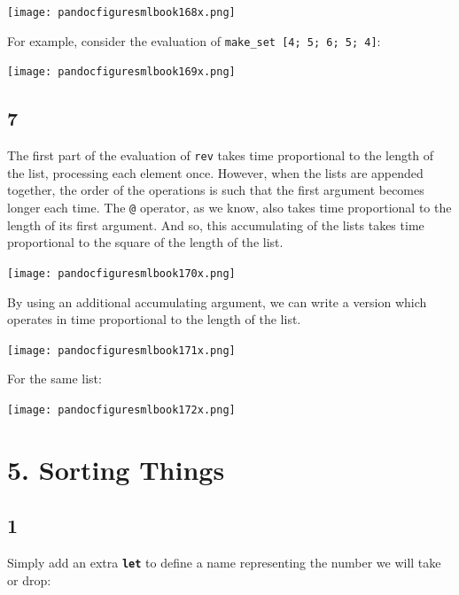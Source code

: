 \documentclass[]{book}
\begin{document}
\medskip
\begin{center}
\noindent\texttt{[image: pandocfiguresmlbook168x.png]}
\end{center}
\medskip

\noindent For example, consider the evaluation of \texttt{make\_set [4; 5; 6; 5; 4]}:

\medskip
\begin{center}
\noindent\texttt{[image: pandocfiguresmlbook169x.png]}
\end{center}
\medskip


\subsection*{7}
The first part of the evaluation of \texttt{rev} takes time proportional to the length of the list, processing each element once. However, when the lists are appended together, the order of the operations is such that the first argument becomes longer each time. The \verb!@! operator, as we know, also takes time proportional to the length of its first argument. And so, this accumulating of the lists takes time proportional to the square of the length of the list.

\medskip
\begin{center}
\noindent\texttt{[image: pandocfiguresmlbook170x.png]}
\end{center}
\medskip

\noindent By using an additional accumulating argument, we can write a version which operates in time proportional to the length of the list.

\medskip
\begin{center}
\noindent\texttt{[image: pandocfiguresmlbook171x.png]}
\end{center}
\medskip

\noindent For the same list:

\medskip
\begin{center}
\noindent\texttt{[image: pandocfiguresmlbook172x.png]}
\end{center}
\medskip


\section*{5. Sorting Things}
\subsection*{1}
Simply add an extra \textbf{\texttt{let}} to define a name representing the number we will take or drop:
\end{document}
